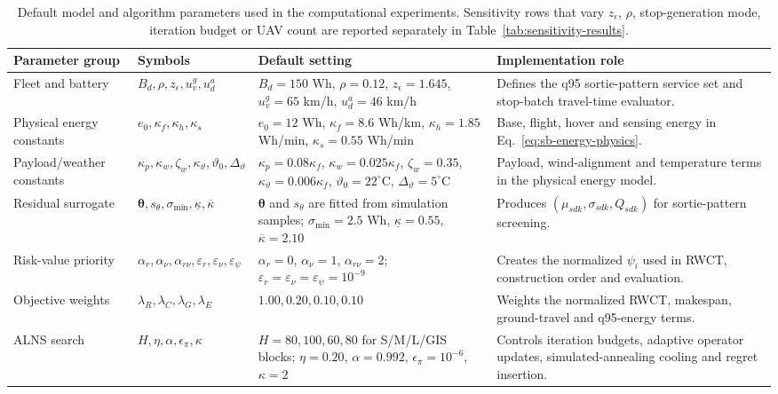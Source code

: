 \begin{table}[t]
\centering
\caption{Default model and algorithm parameters used in the computational experiments. Sensitivity rows that vary \(z_\epsilon\), \(\rho\), stop-generation mode, iteration budget or UAV count are reported separately in Table~\ref{tab:sensitivity-results}.}
\label{tab:model-parameters}
\footnotesize
\setlength{\tabcolsep}{3pt}
\renewcommand{\arraystretch}{1.08}
\begin{tabularx}{\textwidth}{@{}p{}p{}p{}X@{}}
\toprule
Parameter group & Symbols & Default setting & Implementation role \\
\midrule
Fleet and battery & \(B_d,\rho,z_\epsilon,u^g_v,u^a_d\) & \(B_d=150\) Wh, \(\rho=0.12\), \(z_\epsilon=1.645\), \(u^g_v=65\) km/h, \(u^a_d=46\) km/h & Defines the q95 sortie-pattern service set and stop-batch travel-time evaluator. \\
Physical energy constants & \(e_0,\kappa_f,\kappa_h,\kappa_s\) & \(e_0=12\) Wh, \(\kappa_f=8.6\) Wh/km, \(\kappa_h=1.85\) Wh/min, \(\kappa_s=0.55\) Wh/min & Base, flight, hover and sensing energy in Eq.~\eqref{eq:sb-energy-physics}. \\
Payload/weather constants & \(\kappa_p,\kappa_w,\zeta_w,\kappa_\vartheta,\vartheta_0,\Delta_\vartheta\) & \(\kappa_p=0.08\kappa_f\), \(\kappa_w=0.025\kappa_f\), \(\zeta_w=0.35\), \(\kappa_\vartheta=0.006\kappa_f\), \(\vartheta_0=22^\circ\)C, \(\Delta_\vartheta=5^\circ\)C & Payload, wind-alignment and temperature terms in the physical energy model. \\
Residual surrogate & \(\boldsymbol\theta,s_\theta,\sigma_{\min},\underline\kappa,\overline\kappa\) & \(\boldsymbol\theta\) and \(s_\theta\) are fitted from simulation samples; \(\sigma_{\min}=2.5\) Wh, \(\underline\kappa=0.55\), \(\overline\kappa=2.10\) & Produces \((\mu_{sdk},\sigma_{sdk},Q_{sdk})\) for sortie-pattern screening. \\
Risk-value priority & \(\alpha_r,\alpha_\nu,\alpha_{r\nu},\varepsilon_r,\varepsilon_\nu,\varepsilon_\psi\) & \(\alpha_r=0\), \(\alpha_\nu=1\), \(\alpha_{r\nu}=2\); \(\varepsilon_r=\varepsilon_\nu=\varepsilon_\psi=10^{-9}\) & Creates the normalized \(\psi_i\) used in RWCT, construction order and evaluation. \\
Objective weights & \(\lambda_R,\lambda_C,\lambda_G,\lambda_E\) & \(1.00,0.20,0.10,0.10\) & Weights the normalized RWCT, makespan, ground-travel and q95-energy terms. \\
ALNS search & \(H,\eta,\alpha,\epsilon_\pi,\kappa\) & \(H=80,100,60,80\) for S/M/L/GIS blocks; \(\eta=0.20\), \(\alpha=0.992\), \(\epsilon_\pi=10^{-6}\), \(\kappa=2\) & Controls iteration budgets, adaptive operator updates, simulated-annealing cooling and regret insertion. \\
\bottomrule
\end{tabularx}
\end{table}
